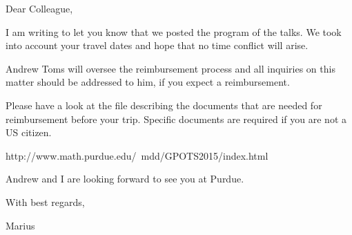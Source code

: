 Dear Colleague,

I am writing to let you know that we posted the program of the talks.
We took into account your travel dates and hope that no time conflict will arise.

Andrew Toms will oversee the reimbursement process and all inquiries on this matter should be addressed to him, 
if you expect a reimbursement.

Please have a look at the file describing the documents that are needed for reimbursement before your trip.
Specific documents are required if you are not a US citizen.

http://www.math.purdue.edu/~mdd/GPOTS2015/index.html

Andrew and I are looking forward to see you at Purdue.

With best regards,

Marius 